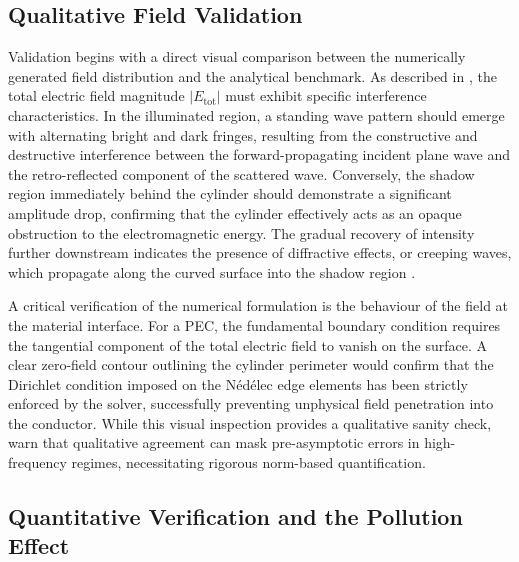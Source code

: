 \subsection{Qualitative Field Validation}

Validation begins with a direct visual comparison between the numerically generated field distribution and the analytical benchmark. As described in \citet{Wriedt2012}, the total electric field magnitude $|E_{\text{tot}}|$ must exhibit specific interference characteristics. In the illuminated region, a standing wave pattern should emerge with alternating bright and dark fringes, resulting from the constructive and destructive interference between the forward-propagating incident plane wave and the retro-reflected component of the scattered wave. Conversely, the shadow region immediately behind the cylinder should demonstrate a significant amplitude drop, confirming that the cylinder effectively acts as an opaque obstruction to the electromagnetic energy. The gradual recovery of intensity further downstream indicates the presence of diffractive effects, or creeping waves, which propagate along the curved surface into the shadow region \citep{Martin1993}.

\vspace{12pt}

A critical verification of the numerical formulation is the behaviour of the field at the material interface. For a PEC, the fundamental boundary condition requires the tangential component of the total electric field to vanish on the surface. A clear zero-field contour outlining the cylinder perimeter would confirm that the Dirichlet condition imposed on the Nédélec edge elements has been strictly enforced by the solver, successfully preventing unphysical field penetration into the conductor. While this visual inspection provides a qualitative sanity check, \citet{Frelet2024} warn that qualitative agreement can mask pre-asymptotic errors in high-frequency regimes, necessitating rigorous norm-based quantification.

\subsection{Quantitative Verification and the Pollution Effect}


